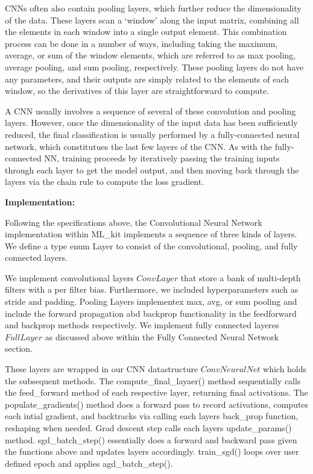 CNNs often also contain pooling layers, which further reduce the dimensionality of the data.
These layers scan a `window' along the input matrix, combining all the elements in each window into a single output element.
This combination process can be done in a number of ways, including taking the maximum, average, or sum of the window elements, which are referred to as max pooling, average pooling, and sum pooling, respectively.
These pooling layers do not have any parameters, and their outputs are simply related to the elements of each window, so the derivatives of this layer are straightforward to compute.

A CNN usually involves a sequence of several of these convolution and pooling layers.
However, once the dimensionality of the input data has been sufficiently reduced, the final classification is usually performed by a fully-connected neural network, which constitutues the last few layers of the CNN.
As with the fully-connected NN, training proceeds by iteratively passing the training inputs through each layer to get the model output, and then moving back through the layers via the chain rule to compute the loss gradient.

\begin{center}
 \textbf{Implementation:}
\end{center}

Following the specifications above, the Convolutional Neural Network implementation within ML_kit implements a sequence of three kinds of layers. 
We define a type enum Layer to consist of the convolutional, pooling, and fully connected layers. 

We implement convolutional layers $ConvLayer$ that store a bank of multi-depth filters with a per filter bias. Furthermore, we included hyperparameters 
such as stride and padding. Pooling Layers implementex max, avg, or sum pooling and include the forward propagation abd backprop functionality in the feedforward 
and backprop methods respectively. We implement fully connected layeres $FullLayer$ as discussed above within the Fully Connected Neural Network section. 

These layers are wrapped in our CNN datastructure $ConvNeuralNet$ which holds the subsequent methods. The compute_final_layaer() method sequentially calls the 
feed_forward method of each respective layer, returning final activations. The populate_gradients() method does a forward pass to record activations, computes 
each intial gradient, and backtracks via calling each layers back_prop function, reshaping when needed. Grad descent step calls each layers update_params() method. 
sgd_batch_step() essentially does a forward and backward pass given the functions above and updates layers accordingly. train_sgd() loops over user defined epoch and applies 
agd_batch_step(). 


